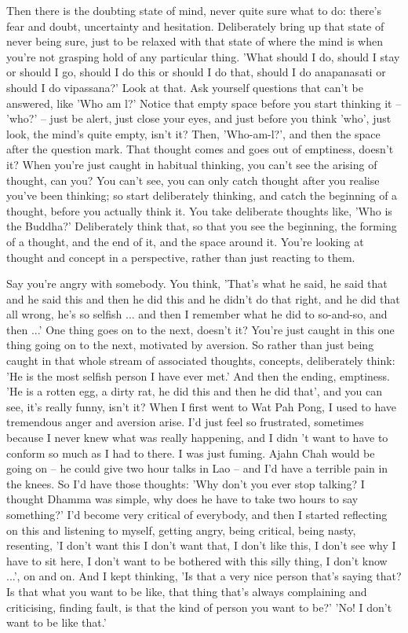 Then there is the doubting state of mind, never quite sure what to do: there's fear and doubt, uncertainty and hesitation. Deliberately bring up that state of never being sure, just to be relaxed with that state of where the mind is when you're not grasping hold of any particular thing. 'What should I do, should I stay or should I go, should I do this or should I do that, should I do anapanasati or should I do vipassana?' Look at that. Ask yourself questions that can't be answered, like 'Who am l?' Notice that empty space before you start thinking it -- 'who?' -- just be alert, just close your eyes, and just before you think 'who', just look, the mind's quite empty, isn't it? Then, 'Who-am-l?', and then the space after the question mark. That thought comes and goes out of emptiness, doesn't it? When you're just caught in habitual thinking, you can't see the arising of thought, can you? You can't see, you can only catch thought after you realise you've been thinking; so start deliberately thinking, and catch the beginning of a thought, before you actually think it. You take deliberate thoughts like, 'Who is the Buddha?' Deliberately think that, so that you see the beginning, the forming of a thought, and the end of it, and the space around it. You're looking at thought and concept in a perspective, rather than just reacting to them.

Say you're angry with somebody. You think, 'That's what he said, he said that and he said this and then he did this and he didn't do that right, and he did that all wrong, he's so selfish ... and then I remember what he did to so-and-so, and then ...' One thing goes on to the next, doesn't it? You're just caught in this one thing going on to the next, motivated by aversion. So rather than just being caught in that whole stream of associated thoughts, concepts, deliberately think: 'He is the most selfish person I have ever met.' And then the ending, emptiness. 'He is a rotten egg, a dirty rat, he did this and then he did that', and you can see, it's really funny, isn't it? When I first went to Wat Pah Pong, I used to have tremendous anger and aversion arise. I'd just feel so frustrated, sometimes because I never knew what was really happening, and I didn 't want to have to conform so much as I had to there. I was just fuming. Ajahn Chah would be going on -- he could give two hour talks in Lao -- and I'd have a terrible pain in the knees. So I'd have those thoughts: 'Why don't you ever stop talking? I thought Dhamma was simple, why does he have to take two hours to say something?' I'd become very critical of everybody, and then I started reflecting on this and listening to myself, getting angry, being critical, being nasty, resenting, 'I don't want this I don't want that, I don't like this, I don't see why I have to sit here, I don't want to be bothered with this silly thing, I don't know ...', on and on. And I kept thinking, 'Is that a very nice person that's saying that? Is that what you want to be like, that thing that's always complaining and criticising, finding fault, is that the kind of person you want to be?' 'No! I don't want to be like that.'


